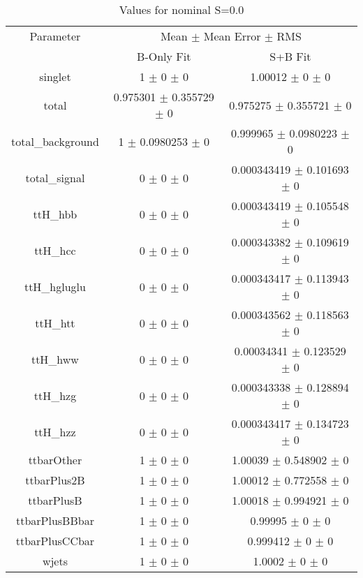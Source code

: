 \begin{table}
\centering
\caption{Values for nominal S=0.0}
\begin{tabular}{ccc}
\toprule
Parameter & \multicolumn{2}{c}{Mean $\pm$ Mean Error $\pm$ RMS}\\
 & B-Only Fit & S+B Fit\\
\midrule
singlet & \num{1} $\pm$ \num{0} $\pm$ \num{0} & \num{1.00012} $\pm$ \num{0} $\pm$ \num{0}\\
total & \num{0.975301} $\pm$ \num{0.355729} $\pm$ \num{0} & \num{0.975275} $\pm$ \num{0.355721} $\pm$ \num{0}\\
total\_background & \num{1} $\pm$ \num{0.0980253} $\pm$ \num{0} & \num{0.999965} $\pm$ \num{0.0980223} $\pm$ \num{0}\\
total\_signal & \num{0} $\pm$ \num{0} $\pm$ \num{0} & \num{0.000343419} $\pm$ \num{0.101693} $\pm$ \num{0}\\
ttH\_hbb & \num{0} $\pm$ \num{0} $\pm$ \num{0} & \num{0.000343419} $\pm$ \num{0.105548} $\pm$ \num{0}\\
ttH\_hcc & \num{0} $\pm$ \num{0} $\pm$ \num{0} & \num{0.000343382} $\pm$ \num{0.109619} $\pm$ \num{0}\\
ttH\_hgluglu & \num{0} $\pm$ \num{0} $\pm$ \num{0} & \num{0.000343417} $\pm$ \num{0.113943} $\pm$ \num{0}\\
ttH\_htt & \num{0} $\pm$ \num{0} $\pm$ \num{0} & \num{0.000343562} $\pm$ \num{0.118563} $\pm$ \num{0}\\
ttH\_hww & \num{0} $\pm$ \num{0} $\pm$ \num{0} & \num{0.00034341} $\pm$ \num{0.123529} $\pm$ \num{0}\\
ttH\_hzg & \num{0} $\pm$ \num{0} $\pm$ \num{0} & \num{0.000343338} $\pm$ \num{0.128894} $\pm$ \num{0}\\
ttH\_hzz & \num{0} $\pm$ \num{0} $\pm$ \num{0} & \num{0.000343417} $\pm$ \num{0.134723} $\pm$ \num{0}\\
ttbarOther & \num{1} $\pm$ \num{0} $\pm$ \num{0} & \num{1.00039} $\pm$ \num{0.548902} $\pm$ \num{0}\\
ttbarPlus2B & \num{1} $\pm$ \num{0} $\pm$ \num{0} & \num{1.00012} $\pm$ \num{0.772558} $\pm$ \num{0}\\
ttbarPlusB & \num{1} $\pm$ \num{0} $\pm$ \num{0} & \num{1.00018} $\pm$ \num{0.994921} $\pm$ \num{0}\\
ttbarPlusBBbar & \num{1} $\pm$ \num{0} $\pm$ \num{0} & \num{0.99995} $\pm$ \num{0} $\pm$ \num{0}\\
ttbarPlusCCbar & \num{1} $\pm$ \num{0} $\pm$ \num{0} & \num{0.999412} $\pm$ \num{0} $\pm$ \num{0}\\
wjets & \num{1} $\pm$ \num{0} $\pm$ \num{0} & \num{1.0002} $\pm$ \num{0} $\pm$ \num{0}\\
\bottomrule
\end{tabular}
\end{table}